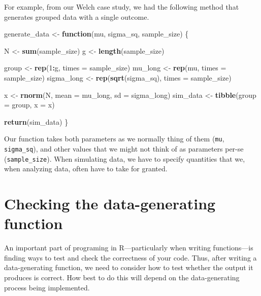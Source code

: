 \documentclass[
]{book}
\newenvironment{Shaded}{\begin{snugshade}}{\end{snugshade}}
\newcommand{\AttributeTok}[1]{\textcolor[rgb]{0.13,0.29,0.53}{#1}}
\newcommand{\ControlFlowTok}[1]{\textcolor[rgb]{0.13,0.29,0.53}{\textbf{#1}}}
\newcommand{\DecValTok}[1]{\textcolor[rgb]{0.00,0.00,0.81}{#1}}
\newcommand{\FunctionTok}[1]{\textcolor[rgb]{0.13,0.29,0.53}{\textbf{#1}}}
\newcommand{\NormalTok}[1]{#1}
\newcommand{\OtherTok}[1]{\textcolor[rgb]{0.56,0.35,0.01}{#1}}
\newcommand{\SpecialCharTok}[1]{\textcolor[rgb]{0.81,0.36,0.00}{\textbf{#1}}}
\begin{document}
For example, from our Welch case study, we had the following method that generates grouped data with a single outcome.

\begin{Shaded}
\begin{Highlighting}[]
\NormalTok{generate\_data }\OtherTok{\textless{}{-}} \ControlFlowTok{function}\NormalTok{(mu, sigma\_sq, sample\_size) \{}

\NormalTok{  N }\OtherTok{\textless{}{-}} \FunctionTok{sum}\NormalTok{(sample\_size) }
\NormalTok{  g }\OtherTok{\textless{}{-}} \FunctionTok{length}\NormalTok{(sample\_size) }
  
\NormalTok{  group }\OtherTok{\textless{}{-}} \FunctionTok{rep}\NormalTok{(}\DecValTok{1}\SpecialCharTok{:}\NormalTok{g, }\AttributeTok{times =}\NormalTok{ sample\_size) }
\NormalTok{  mu\_long }\OtherTok{\textless{}{-}} \FunctionTok{rep}\NormalTok{(mu, }\AttributeTok{times =}\NormalTok{ sample\_size)}
\NormalTok{  sigma\_long }\OtherTok{\textless{}{-}} \FunctionTok{rep}\NormalTok{(}\FunctionTok{sqrt}\NormalTok{(sigma\_sq), }\AttributeTok{times =}\NormalTok{ sample\_size) }
  
\NormalTok{  x }\OtherTok{\textless{}{-}} \FunctionTok{rnorm}\NormalTok{(N, }\AttributeTok{mean =}\NormalTok{ mu\_long, }\AttributeTok{sd =}\NormalTok{ sigma\_long)}
\NormalTok{  sim\_data }\OtherTok{\textless{}{-}} \FunctionTok{tibble}\NormalTok{(}\AttributeTok{group =}\NormalTok{ group, }\AttributeTok{x =}\NormalTok{ x)}
    
  \FunctionTok{return}\NormalTok{(sim\_data)}
\NormalTok{\}}
\end{Highlighting}
\end{Shaded}

Our function takes both parameters as we normally thing of them (\texttt{mu}, \texttt{sigma\_sq}), and other values that we might not think of as parameters per-se (\texttt{sample\_size}).
When simulating data, we have to specify quantities that we, when analyzing data, often have to take for granted.

\section{Checking the data-generating function}\label{checking-the-data-generating-function}

An important part of programing in R---particularly when writing functions---is finding ways to test and check the correctness of your code. Thus, after writing a data-generating function, we need to consider how to test whether the output it produces is correct. How best to do this will depend on the data-generating process being implemented.
\end{document}
